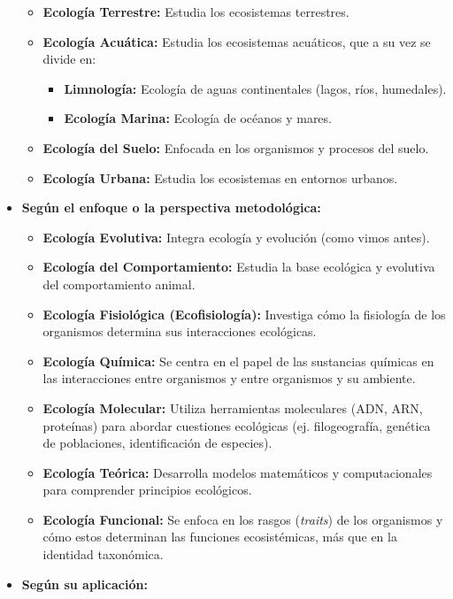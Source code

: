 \documentclass[
]{book}
\providecommand{\tightlist}{%
  \setlength{\itemsep}{0pt}\setlength{\parskip}{0pt}}
\begin{document}
\begin{itemize}
  \begin{itemize}
  \tightlist
  \item
    \textbf{Ecología Terrestre:} Estudia los ecosistemas terrestres.
  \item
    \textbf{Ecología Acuática:} Estudia los ecosistemas acuáticos, que a su vez se divide en:

    \begin{itemize}
    \tightlist
    \item
      \textbf{Limnología:} Ecología de aguas continentales (lagos, ríos, humedales).
    \item
      \textbf{Ecología Marina:} Ecología de océanos y mares.
    \end{itemize}
  \item
    \textbf{Ecología del Suelo:} Enfocada en los organismos y procesos del suelo.
  \item
    \textbf{Ecología Urbana:} Estudia los ecosistemas en entornos urbanos.
  \end{itemize}
\item
  \textbf{Según el enfoque o la perspectiva metodológica:}

  \begin{itemize}
  \tightlist
  \item
    \textbf{Ecología Evolutiva:} Integra ecología y evolución (como vimos antes).
  \item
    \textbf{Ecología del Comportamiento:} Estudia la base ecológica y evolutiva del comportamiento animal.
  \item
    \textbf{Ecología Fisiológica (Ecofisiología):} Investiga cómo la fisiología de los organismos determina sus interacciones ecológicas.
  \item
    \textbf{Ecología Química:} Se centra en el papel de las sustancias químicas en las interacciones entre organismos y entre organismos y su ambiente.
  \item
    \textbf{Ecología Molecular:} Utiliza herramientas moleculares (ADN, ARN, proteínas) para abordar cuestiones ecológicas (ej. filogeografía, genética de poblaciones, identificación de especies).
  \item
    \textbf{Ecología Teórica:} Desarrolla modelos matemáticos y computacionales para comprender principios ecológicos.
  \item
    \textbf{Ecología Funcional:} Se enfoca en los rasgos (\emph{traits}) de los organismos y cómo estos determinan las funciones ecosistémicas, más que en la identidad taxonómica.
  \end{itemize}
\item
  \textbf{Según su aplicación:}


\end{itemize}
\end{document}

